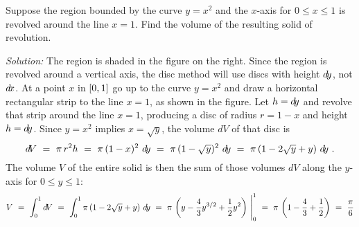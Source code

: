 \begin{exmp}
\noindent Suppose the region bounded by the curve $y=x^2$ and the $x$-axis
for $0 \le x \le 1$ is revolved around the line $x=1$. Find the
volume of the resulting solid of revolution.\vspace{0.5mm}
\par\noindent\emph{Solution:} The region is shaded in the figure on the right.
Since the region is revolved around a vertical axis, the disc method
will use discs with height $d\!y$, not $d\!x$.
At a point $x$ in $\lbrack 0,1 \rbrack$ go up to the curve $y=x^2$ and draw a horizontal
rectangular strip to the line $x=1$, as shown in the figure. Let
$h=d\!y$ and revolve that strip around the line $x=1$, producing a disc of radius
$r=1-x$ and height $h=d\!y$. Since $y=x^2$ implies $x=\sqrt{y}$, the volume
$d\!V$ of that disc is
\[
d\!V ~=~ \pi\,r^2 h ~=~ \pi\,(1-x)^2~d\!y ~=~ \pi\,(1-\sqrt{y})^2~d\!y ~=~
\pi\,(1 - 2\sqrt{y} + y)~d\!y ~.
\]
The volume $V$ of the entire solid is then the sum of those volumes $d\!V$ along
the $y$-axis for $0\le y\le 1$:
\[
V ~=~ \int_0^1 d\!V ~=~ \int_0^1 \pi\,(1 - 2\sqrt{y} + y)~d\!y ~=~
\pi\,\left(y - \frac{4}{3}y^{3/2} + \frac{1}{2}y^2 \right)~\Biggr|_0^1 ~=~
\pi\,\left(1 - \frac{4}{3} + \frac{1}{2}\right) ~=~ \frac{\pi}{6}
\]
\end{exmp}
\divider
\vspace{2mm}

